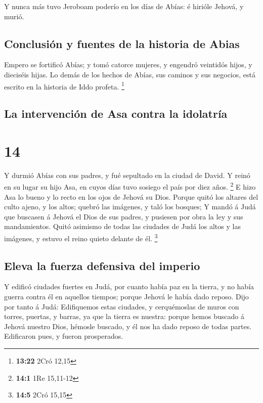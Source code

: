  Y nunca más tuvo Jeroboam poderío en los días de Abías: é
hirióle Jehová, y murió.

\hypertarget{conclusiuxf3n-y-fuentes-de-la-historia-de-abias}{%
\subsection{Conclusión y fuentes de la historia de
Abias}\label{conclusiuxf3n-y-fuentes-de-la-historia-de-abias}}

 Empero se fortificó Abías; y tomó catorce mujeres, y
engendró veintidós hijos, y dieciséis hijas.  Lo demás de
los hechos de Abías, sus caminos y sus negocios, está escrito en la
historia de Iddo profeta. \footnote{\textbf{13:22} 2Cró 12,15}

\hypertarget{la-intervenciuxf3n-de-asa-contra-la-idolatruxeda}{%
\subsection{La intervención de Asa contra la
idolatría}\label{la-intervenciuxf3n-de-asa-contra-la-idolatruxeda}}

\hypertarget{section-13}{%
\section{14}\label{section-13}}

 Y durmió Abías con sus padres, y fué sepultado en la ciudad
de David. Y reinó en su lugar su hijo Asa, en cuyos días tuvo sosiego el
país por diez años. \footnote{\textbf{14:1} 1Re 15,11-12}  E
hizo Asa lo bueno y lo recto en los ojos de Jehová su Dios. 
Porque quitó los altares del culto ajeno, y los altos; quebró las
imágenes, y taló los bosques;  Y mandó á Judá que buscasen á
Jehová el Dios de sus padres, y pusiesen por obra la ley y sus
mandamientos.  Quitó asimismo de todas las ciudades de Judá
los altos y las imágenes, y estuvo el reino quieto delante de él.
\footnote{\textbf{14:5} 2Cró 15,15}

\hypertarget{eleva-la-fuerza-defensiva-del-imperio}{%
\subsection{Eleva la fuerza defensiva del
imperio}\label{eleva-la-fuerza-defensiva-del-imperio}}

 Y edificó ciudades fuertes en Judá, por cuanto había paz en
la tierra, y no había guerra contra él en aquellos tiempos; porque
Jehová le había dado reposo.  Dijo por tanto á Judá:
Edifiquemos estas ciudades, y cerquémoslas de muros con torres, puertas,
y barras, ya que la tierra es nuestra: porque hemos buscado á Jehová
nuestro Dios, hémosle buscado, y él nos ha dado reposo de todas partes.
Edificaron pues, y fueron prosperados.

